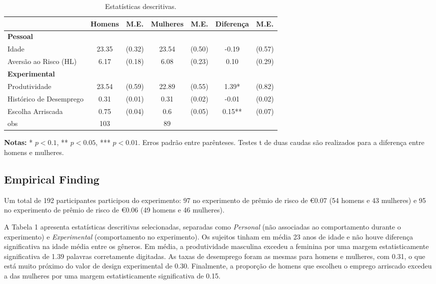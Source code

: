 \documentclass[a4paper,12pt]{article}[abntex2]
\begin{document}
\begin{table}[H]
\centering
\begin{tabular}{lcccccc}
\hline
           & \textbf{Homens} & \textbf{M.E.} & \textbf{Mulheres} & \textbf{M.E.} & \textbf{Diferença} & \textbf{M.E.} \\
\hline
\textbf{Pessoal}      &               &                &                 &                &                &               \\
Idade       & 23.35         & (0.32)        & 23.54          & (0.50)         & -0.19          & (0.57)         \\
Aversão ao Risco (HL) & 6.17          & (0.18)         & 6.08           & (0.23)         & 0.10           & (0.29)         \\
\textbf{Experimental} &               &                &                 &                &                &               \\
Produtividade  & 23.54         & (0.59)        & 22.89          & (0.55)         & 1.39*          & (0.82)         \\
Histórico de Desemprego & 0.31          & (0.01)         & 0.31           & (0.02)         & -0.01          & (0.02)         \\
Escolha Arriscada  & 0.75          & (0.04)         & 0.6            & (0.05)         & 0.15**         & (0.07)         \\
\hline
obs        & 103           &                & 89             &                &                &               \\
\hline
\end{tabular}
\caption{Estatísticas descritivas.}
\end{table}

\textbf{Notas:} * \( p < 0.1 \), ** \( p < 0.05 \), *** \( p < 0.01 \). Erros padrão entre parênteses. Testes t de duas caudas são realizados para a diferença entre homens e mulheres.

\subsection{\textbf{ Empirical Finding}}

Um total de 192 participantes participou do experimento: 97 no experimento de prêmio de risco de €0.07 (54 homens e 43 mulheres) e 95 no experimento de prêmio de risco de €0.06 (49 homens e 46 mulheres).

A Tabela 1 apresenta estatísticas descritivas selecionadas, separadas como \textit{Personal} (não associadas ao comportamento durante o experimento) e \textit{Experimental} (comportamento no experimento). Os sujeitos tinham em média 23 anos de idade e não houve diferença significativa na idade média entre os gêneros. Em média, a produtividade masculina excedeu a feminina por uma margem estatisticamente significativa de 1.39 palavras corretamente digitadas. As taxas de desemprego foram as mesmas para homens e mulheres, com 0.31, o que está muito próximo do valor de design experimental de 0.30. Finalmente, a proporção de homens que escolheu o emprego arriscado excedeu a das mulheres por uma margem estatisticamente significativa de 0.15.
\end{document}
